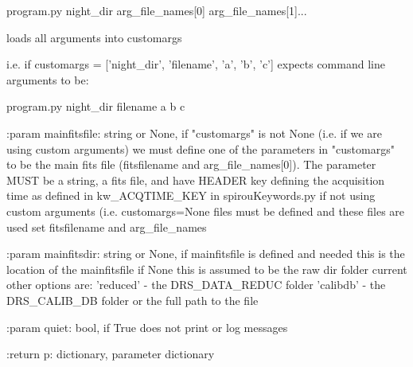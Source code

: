 \begin{minipage}{\textwidth}
\begin{pythondocstring}
            program.py night_dir arg_file_names[0] arg_file_names[1]...

       loads all arguments into customargs

       i.e. if customargs = ['night_dir', 'filename', 'a', 'b', 'c']
       expects command line arguments to be:

            program.py night_dir filename a b c

:param mainfitsfile: string or None, if "customargs" is not None (i.e. if we
                     are using custom arguments) we must define one
                     of the parameters in "customargs" to be the main fits
                     file (fitsfilename and arg_file_names[0]).
                     The parameter MUST be a string, a fits file,
                     and have HEADER key defining the acquisition time
                     as defined in kw_ACQTIME_KEY in spirouKeywords.py
                     if not using custom arguments (i.e. customargs=None
                     files must be defined and these files are used
                     set fitsfilename and arg_file_names

:param mainfitsdir: string or None, if mainfitsfile is defined and needed
                    this is the location of the mainfitsfile if None this
                    is assumed to be the raw dir folder
                    current other options are:
                        'reduced' - the DRS_DATA_REDUC folder
                        'calibdb' - the DRS_CALIB_DB folder
                        or the full path to the file



:param quiet: bool, if True does not print or log messages

:return p: dictionary, parameter dictionary
\end{pythondocstring}
\end{minipage}


